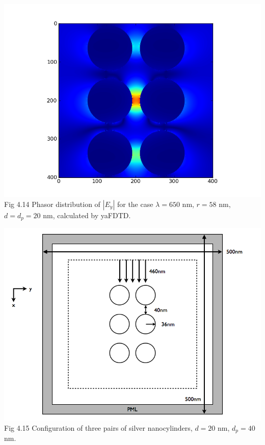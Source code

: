 \documentclass[openany]{book}
\begin{document}
\begin{center}
\includegraphics[scale=0.8]{images/ey-r58.png}\\
Fig 4.14
Phasor distribution of $|E_y|$ for the case $\lambda = 650$ nm, $r = 58$ nm, $d = d_p = 20$ nm, calculated by yaFDTD.
\end{center}


\begin{center}
\includegraphics[scale=0.5]{images/open-cavity-config-d40.png}\\
Fig 4.15
Configuration of three pairs of silver nanocylinders, $d = 20$ nm, $d_p = 40$ nm.
\end{center}
\end{document}
